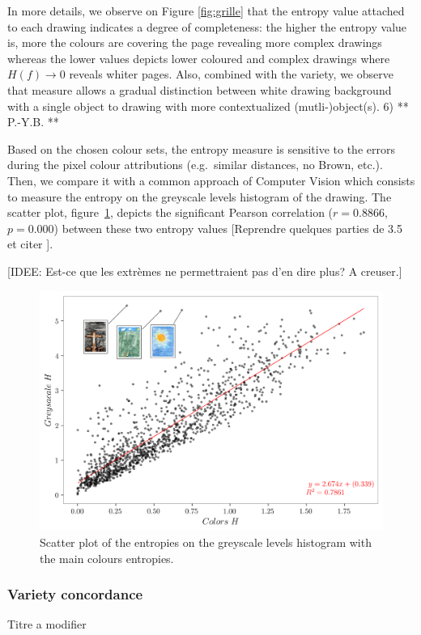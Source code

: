 \documentclass[11pt,a4paper]{article}
\begin{document}
In more details, we observe on Figure \ref{fig:grille} that the entropy value attached to each drawing indicates a degree of completeness: the higher the entropy value is, more the colours are covering the page revealing more complex drawings whereas the lower values depicts lower coloured and complex drawings where $H(f) \rightarrow 0$ reveals whiter pages.
Also, combined with the variety, we observe that measure allows a gradual distinction between white drawing background with a single object to drawing with more contextualized (mutli-)object(s).
{\color{red} 6) ** P.-Y.B. **}


Based on the chosen colour sets, the entropy measure is sensitive to the errors during the pixel colour attributions (e.g.~similar distances, no Brown, etc.). 
Then, we compare it with a common approach of Computer Vision which consists to measure the entropy on the greyscale levels histogram of the drawing. 
The scatter plot, figure~\ref{fig:entropies}, depicts the significant Pearson correlation ($r=0.8866$, $p=0.000$) between these two entropy values {\color{red}[Reprendre quelques parties de 3.5 et citer \citet{wu2013}]}. 

{\small \color{teal}[IDEE: Est-ce que les extr\`emes ne permettraient pas d'en dire plus? A creuser.]}

\begin{figure}[h!]
	\centering
	\includegraphics[width=\linewidth]{figures/colors-greysacale-entropies.png}
	\caption{Scatter plot of the entropies on the greyscale levels histogram with the main colours entropies.}
	\label{fig:entropies}
\end{figure}

\subsubsection{Variety concordance} {\color{red} Titre a modifier}
\label{sec:results_variety_concordance}
\end{document}
